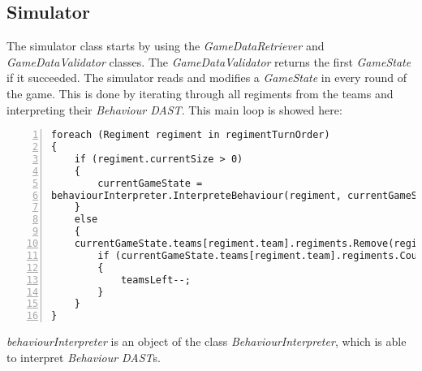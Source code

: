 \subsection{Simulator}
	The simulator class starts by using the {\it GameDataRetriever} and {\it GameDataValidator} classes. The \textit{GameDataValidator} returns the first 
	\textit{GameState} if it succeeded. The simulator reads and modifies a \textit{GameState} in every round of the game. This is done by iterating through all 
	regiments from the teams and interpreting their \textit{Behaviour DAST}. This main loop is showed here: \\
	\begin{lstlisting}[basicstyle=\small\sffamily,
		keywords={break,case,const,continue,default,else,enum,
		for,if,return,switch,while,do,long,void,int,float,double,
		char,struct,typedef,include,size\_t},
		keywordstyle={\color{blue}},
		comment={[l]{//}}, morecomment={[s]{/*}{*/}}, commentstyle=\itshape,
		columns={[l]flexible}, numbers=left, numberstyle=\tiny,
		frameround=fftt, frame=shadowbox, captionpos=b,
		caption={Main loop of the simulation},
		label=impl:regimentloop]
foreach (Regiment regiment in regimentTurnOrder)
{
	if (regiment.currentSize > 0)
	{
		currentGameState = 
behaviourInterpreter.InterpreteBehaviour(regiment, currentGameState);
	}
	else
	{
	currentGameState.teams[regiment.team].regiments.Remove(regiment);
		if (currentGameState.teams[regiment.team].regiments.Count <= 0)
		{
			teamsLeft--;
		}
	}
}
	\end{lstlisting}
	{\it behaviourInterpreter} is an object of the class {\it BehaviourInterpreter}, which is able to interpret \textit{Behaviour DAST}s.
	
